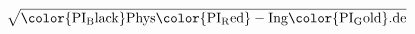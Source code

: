 \documentclass[tikz,convert={outfile=\jobname.svg}]{standalone}
\begin{document}
   \color{PI_Dark_Gray}
   \[
    \sqrt{ \mathrm{\color{PI_Black}Phys}\mathrm{\color{PI_Red}-Ing}\mathrm{\color{PI_Gold}.de}}
   \]
\end{document}

